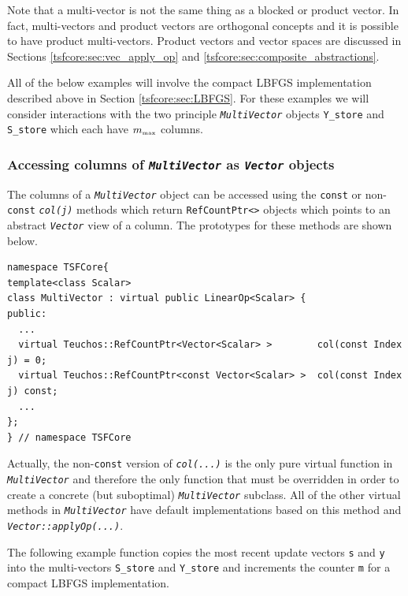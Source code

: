 Note that a multi-vector is not the same thing as a blocked or product
vector.  In fact, multi-vectors and product vectors are orthogonal
concepts and it is possible to have product multi-vectors.  Product
vectors and vector spaces are discussed in Sections
\ref{tsfcore:sec:vec_apply_op} and \ref{tsfcore:sec:composite_abstractions}.

All of the below examples will involve the compact LBFGS
implementation described above in Section \ref{tsfcore:sec:LBFGS}.
For these examples we will consider interactions with the two
principle
\texttt{\textit{Multi\-Vector}} objects \texttt{Y\_store} and
\texttt{S\_store} which each have $m_{\tiny\mbox{max}}$ columns.

%
\subsubsection{Accessing columns of \texttt{\textit{Multi\-Vector}}
as \texttt{\textit{Vector}} objects}
%

The columns of a \texttt{\textit{Multi\-Vector}} object can be accessed
using the \texttt{const} or non-\texttt{const}
\texttt{\textit{col(j)}} methods which return
\texttt{RefCountPtr<>} objects which points to an abstract
\texttt{\textit{Vector}} view of a column.  The prototypes for these
methods are shown below.

{\scriptsize\begin{verbatim}
namespace TSFCore{
template<class Scalar>
class MultiVector : virtual public LinearOp<Scalar> {
public:
  ...
  virtual Teuchos::RefCountPtr<Vector<Scalar> >        col(const Index j) = 0;
  virtual Teuchos::RefCountPtr<const Vector<Scalar> >  col(const Index j) const;
  ...
};
} // namespace TSFCore
\end{verbatim}}

{}\noindent{}Actually, the non-\texttt{const} version of \texttt{\textit{col(...)}}
is the only pure virtual function in \texttt{\textit{Multi\-Vector}} and
therefore the only function that must be overridden in order to create
a concrete (but suboptimal) \texttt{\textit{Multi\-Vector}} subclass.
All of the other virtual methods in \texttt{\textit{Multi\-Vector}} have
default implementations based on this method and
\texttt{\textit{Vector\-::applyOp(\-...)}}.

The following example function copies the most recent update vectors
\texttt{s} and \texttt{y} into the multi-vectors \texttt{S\_store}
and \texttt{Y\_store} and increments the counter \texttt{m} for a
compact LBFGS implementation.

